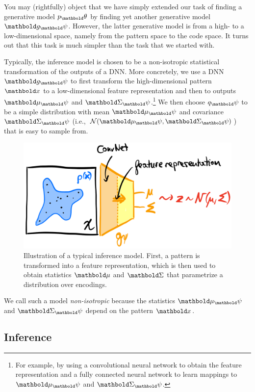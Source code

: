 \documentclass{tufte-handout}
\begin{document}
You may (rightfully) object that we have simply extended our task of finding a generative model $p_\vtheta$ by finding yet another generative model $\vg_\vpsi$. However, the latter generative model is from a high- to a low-dimensional space, namely from the pattern space to the code space. It turns out that this task is much simpler than the task that we started with.

Typically, the inference model is chosen to be a non-isotropic statistical transformation of the outputs of a DNN. More concretely, we use a DNN $\vg_\vpsi$ to first transform the high-dimensional pattern $\vx$ to a low-dimensional feature representation and then to outputs $\vmu_\vpsi$ and $\mSigma_\vpsi$.\footnote[][-1\baselineskip]{For example, by using a convolutional neural network to obtain the feature representation and a fully connected neural network to learn mappings to $\vmu_\vpsi$ and $\mSigma_\vpsi$.} We then choose $q_\vpsi$ to be a simple distribution with mean $\vmu_\vpsi$ and covariance $\mSigma_\vpsi$ (i.e., $\N{\vmu_\vpsi}{\mSigma_\vpsi}$) that is easy to sample from.

\begin{figure}
    \includegraphics[width=\textwidth]{figures/inference_model.png}
    \caption{Illustration of a typical inference model. First, a pattern is transformed into a feature representation, which is then used to obtain statistics $\vmu$ and $\mSigma$ that parametrize a distribution over encodings.}
\end{figure}

We call such a model \emph{non-isotropic} because the statistics $\vmu_\vpsi$ and $\mSigma_\vpsi$ depend on the pattern $\vx$.

\subsection{Inference}
\end{document}
